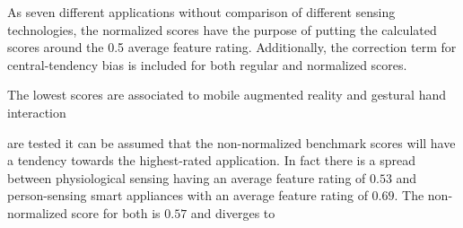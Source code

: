As seven different applications without comparison of different sensing technologies, the normalized scores have the purpose of putting the calculated scores around the 0.5 average feature rating. Additionally, the correction term for central-tendency bias is included for both regular and normalized scores. 

The lowest scores are associated to mobile augmented reality and gestural hand interaction

are tested it can be assumed that the non-normalized benchmark scores will have a tendency towards the highest-rated application. In fact there is a spread between physiological sensing having an average feature rating of $0.53$ and person-sensing smart appliances with an average feature rating of $0.69$. The non-normalized score for both is $0.57$ and diverges to 




